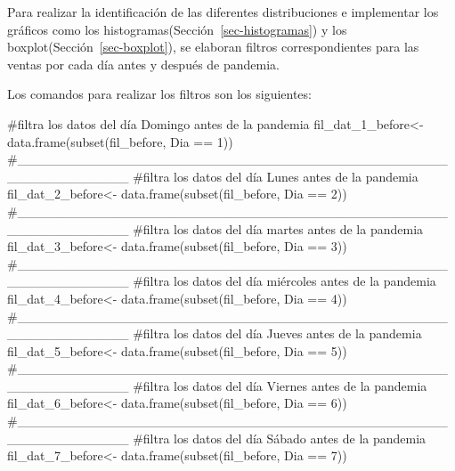 \documentclass[
  us-letterpaper,
]{scrreprt}
\newenvironment{Shaded}{\begin{snugshade}}{\end{snugshade}}
\newcommand{\CommentTok}[1]{\textcolor[rgb]{0.37,0.37,0.37}{#1}}
\newcommand{\DecValTok}[1]{\textcolor[rgb]{0.68,0.00,0.00}{#1}}
\newcommand{\FunctionTok}[1]{\textcolor[rgb]{0.28,0.35,0.67}{#1}}
\newcommand{\NormalTok}[1]{\textcolor[rgb]{0.00,0.23,0.31}{#1}}
\newcommand{\OtherTok}[1]{\textcolor[rgb]{0.00,0.23,0.31}{#1}}
\newcommand{\SpecialCharTok}[1]{\textcolor[rgb]{0.37,0.37,0.37}{#1}}
\theoremstyle{plain}
\theoremstyle{plain}
\theoremstyle{definition}
\theoremstyle{remark}
\begin{document}
Para realizar la identificación de las diferentes distribuciones e
implementar los gráficos como los
histogramas(Sección~\ref{sec-histogramas}) y los
boxplot(Sección~\ref{sec-boxplot}), se elaboran filtros correspondientes
para las ventas por cada día antes y después de pandemia.

Los comandos para realizar los filtros son los siguientes:

\begin{Shaded}
\begin{Highlighting}[]
\CommentTok{\#filtra los datos del día Domingo antes de la pandemia}
\NormalTok{fil\_dat\_1\_before}\OtherTok{\textless{}{-}} \FunctionTok{data.frame}\NormalTok{(}\FunctionTok{subset}\NormalTok{(fil\_before, Dia }\SpecialCharTok{==} \DecValTok{1}\NormalTok{))}
\CommentTok{\#\_\_\_\_\_\_\_\_\_\_\_\_\_\_\_\_\_\_\_\_\_\_\_\_\_\_\_\_\_\_\_\_\_\_\_\_\_\_\_\_\_\_\_\_\_\_\_\_\_\_\_\_\_\_\_\_\_\_\_}
\CommentTok{\#filtra los datos del día Lunes antes de la pandemia}
\NormalTok{fil\_dat\_2\_before}\OtherTok{\textless{}{-}} \FunctionTok{data.frame}\NormalTok{(}\FunctionTok{subset}\NormalTok{(fil\_before, Dia }\SpecialCharTok{==} \DecValTok{2}\NormalTok{))}
\CommentTok{\#\_\_\_\_\_\_\_\_\_\_\_\_\_\_\_\_\_\_\_\_\_\_\_\_\_\_\_\_\_\_\_\_\_\_\_\_\_\_\_\_\_\_\_\_\_\_\_\_\_\_\_\_\_\_\_\_\_\_\_}
\CommentTok{\#filtra los datos del día martes antes de la pandemia}
\NormalTok{fil\_dat\_3\_before}\OtherTok{\textless{}{-}} \FunctionTok{data.frame}\NormalTok{(}\FunctionTok{subset}\NormalTok{(fil\_before, Dia }\SpecialCharTok{==} \DecValTok{3}\NormalTok{))}
\CommentTok{\#\_\_\_\_\_\_\_\_\_\_\_\_\_\_\_\_\_\_\_\_\_\_\_\_\_\_\_\_\_\_\_\_\_\_\_\_\_\_\_\_\_\_\_\_\_\_\_\_\_\_\_\_\_\_\_\_\_\_\_}
\CommentTok{\#filtra los datos del día miércoles antes de la pandemia}
\NormalTok{fil\_dat\_4\_before}\OtherTok{\textless{}{-}} \FunctionTok{data.frame}\NormalTok{(}\FunctionTok{subset}\NormalTok{(fil\_before, Dia }\SpecialCharTok{==} \DecValTok{4}\NormalTok{))}
\CommentTok{\#\_\_\_\_\_\_\_\_\_\_\_\_\_\_\_\_\_\_\_\_\_\_\_\_\_\_\_\_\_\_\_\_\_\_\_\_\_\_\_\_\_\_\_\_\_\_\_\_\_\_\_\_\_\_\_\_\_\_\_}
\CommentTok{\#filtra los datos del día Jueves antes de la pandemia}
\NormalTok{fil\_dat\_5\_before}\OtherTok{\textless{}{-}} \FunctionTok{data.frame}\NormalTok{(}\FunctionTok{subset}\NormalTok{(fil\_before, Dia }\SpecialCharTok{==} \DecValTok{5}\NormalTok{))}
\CommentTok{\#\_\_\_\_\_\_\_\_\_\_\_\_\_\_\_\_\_\_\_\_\_\_\_\_\_\_\_\_\_\_\_\_\_\_\_\_\_\_\_\_\_\_\_\_\_\_\_\_\_\_\_\_\_\_\_\_\_\_\_}
\CommentTok{\#filtra los datos del día Viernes antes de la pandemia}
\NormalTok{fil\_dat\_6\_before}\OtherTok{\textless{}{-}} \FunctionTok{data.frame}\NormalTok{(}\FunctionTok{subset}\NormalTok{(fil\_before, Dia }\SpecialCharTok{==} \DecValTok{6}\NormalTok{))}
\CommentTok{\#\_\_\_\_\_\_\_\_\_\_\_\_\_\_\_\_\_\_\_\_\_\_\_\_\_\_\_\_\_\_\_\_\_\_\_\_\_\_\_\_\_\_\_\_\_\_\_\_\_\_\_\_\_\_\_\_\_\_\_}
\CommentTok{\#filtra los datos del día Sábado antes de la pandemia}
\NormalTok{fil\_dat\_7\_before}\OtherTok{\textless{}{-}} \FunctionTok{data.frame}\NormalTok{(}\FunctionTok{subset}\NormalTok{(fil\_before, Dia }\SpecialCharTok{==} \DecValTok{7}\NormalTok{))}
\end{Highlighting}
\end{Shaded}
\end{document}
